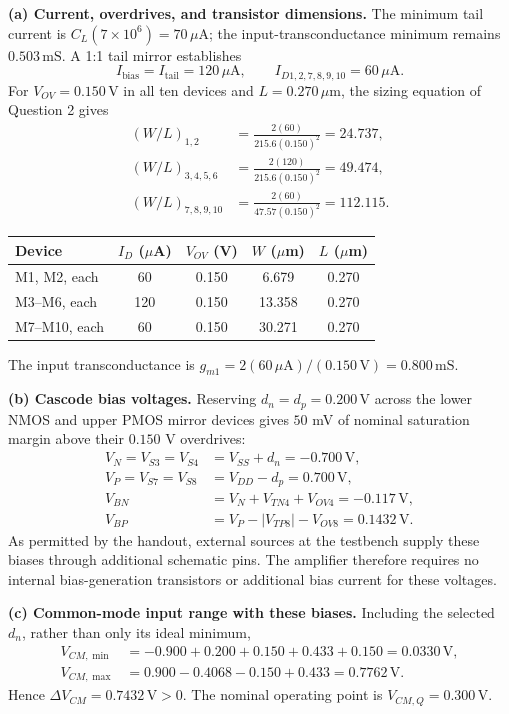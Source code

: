 \documentclass[12pt,letterpaper]{article}
\newcommand{\um}{\,\mu\mathrm{m}}
\newcommand{\uA}{\,\mu\mathrm{A}}
\newcommand{\mS}{\,\mathrm{mS}}
\newcommand{\V}{\,\mathrm{V}}
\begin{document}
\begin{enumerate}
\textbf{(a) Current, overdrives, and transistor dimensions.}
The minimum tail current is $C_L(7\times10^6)=70\uA$;
the input-transconductance minimum remains $0.503\mS$.
A 1:1 tail mirror establishes
\[
I_{\mathrm{bias}}=I_{\mathrm{tail}}=120\uA,\qquad
I_{D1,2,7,8,9,10}=60\uA.
\]
For $V_{OV}=0.150\V$ in all ten devices and $L=0.270\um$,
the sizing equation of Question 2 gives
\begin{align*}
(W/L)_{1,2}&=\frac{2(60)}{215.6(0.150)^2}=24.737,\\
(W/L)_{3,4,5,6}&=\frac{2(120)}{215.6(0.150)^2}=49.474,\\
(W/L)_{7,8,9,10}&=\frac{2(60)}{47.57(0.150)^2}=112.115.
\end{align*}
\begin{center}
\small
\begin{tabular}{@{}lcccc@{}}
\toprule
Device & $I_D$ ($\mu$A) & $V_{OV}$ (V) & $W$ ($\mu$m) & $L$ ($\mu$m)\\
\midrule
M1, M2, each & 60 & 0.150 & 6.679 & 0.270\\
M3--M6, each & 120 & 0.150 & 13.358 & 0.270\\
M7--M10, each & 60 & 0.150 & 30.271 & 0.270\\
\bottomrule
\end{tabular}
\end{center}
The input transconductance is
$g_{m1}=2(60\uA)/(0.150\V)=0.800\mS$.

\textbf{(b) Cascode bias voltages.}
Reserving $d_n=d_p=0.200\V$ across the lower NMOS and upper
PMOS mirror devices gives $50$ mV of nominal saturation
margin above their $0.150$ V overdrives:
\begin{align*}
V_N=V_{S3}=V_{S4}&=V_{SS}+d_n=-0.700\V,\\
V_P=V_{S7}=V_{S8}&=V_{DD}-d_p=0.700\V,\\
V_{BN}&=V_N+V_{TN4}+V_{OV4}=\boxed{-0.117\V,}\\
V_{BP}&=V_P-|V_{TP8}|-V_{OV8}=\boxed{0.1432\V.}
\end{align*}
As permitted by the handout, external sources at the testbench
supply these biases through additional schematic pins. The amplifier
therefore requires no internal bias-generation transistors or
additional bias current for these voltages.

\textbf{(c) Common-mode input range with these biases.}
Including the selected $d_n$, rather than only its ideal minimum,
\begin{align*}
V_{CM,\min}&=-0.900+0.200+0.150+0.433+0.150=0.0330\V,\\
V_{CM,\max}&=0.900-0.4068-0.150+0.433=0.7762\V.
\end{align*}
Hence $\boxed{\Delta V_{CM}=0.7432\V>0}$.
The nominal operating point is $V_{CM,Q}=0.300\V$.


\end{enumerate}
\end{document}
